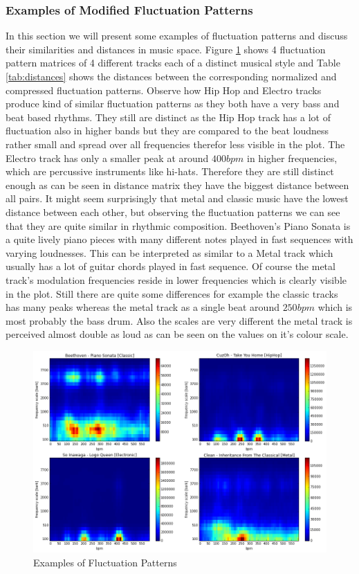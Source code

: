 \documentclass[cic,tc,english]{iiufrgs}
\begin{document}
\subsubsection{Examples of Modified Fluctuation Patterns}
In this section we will present some examples of fluctuation patterns and discuss their similarities and distances in music space. Figure \ref{fig:fp_examples} shows 4 fluctuation pattern matrices of 4 different tracks each of a distinct musical style and Table \ref{tab:distances} shows the distances between the corresponding normalized and compressed fluctuation patterns. Observe how Hip Hop and Electro tracks produce kind of similar fluctuation  patterns as they both have a very bass and beat based rhythms. They still are distinct as the Hip Hop track has a lot of fluctuation also in higher bands but they are compared to the beat loudness rather small and spread over all frequencies therefor less visible in the plot. The Electro track has only a smaller peak at around $400bpm$ in higher frequencies, which are percussive instruments like hi-hats. Therefore they are still distinct enough as can be seen in distance matrix they have the biggest distance between all pairs. It might seem surprisingly that metal and classic music have the lowest distance between each other, but observing the fluctuation patterns we can see that they are quite similar in rhythmic composition. Beethoven's Piano Sonata is a quite lively piano pieces with many different notes played in fast sequences with varying loudnesses. This can be interpreted as similar to a Metal track which usually has a lot of guitar chords played in fast sequence. Of course the metal track's modulation frequencies reside in lower frequencies which is clearly visible in the plot.  Still there are quite some differences for example the classic tracks has many peaks whereas the metal track as a single beat around $250bpm$ which is most probably the bass drum. Also the scales are very different the metal track is perceived almost double as loud as can be seen on the values on it's colour scale.


\begin{figure}
    \caption{Examples of Fluctuation Patterns}
    \begin{center}
        \includegraphics[width=\linewidth]{fp_examples}
    \end{center}
    \label{fig:fp_examples}
\end{figure}
\end{document}
